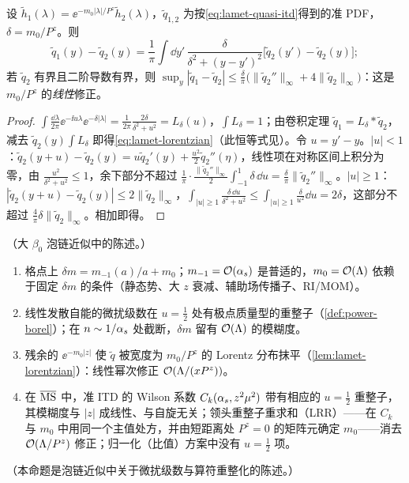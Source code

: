 \begin{lemma}\label{lem:lamet-lorentzian}
设 $\tilde h_1(\lambda)=\ee^{-m_0|\lambda|/P^z}\tilde h_2(\lambda)$，$\tilde q_{1,2}$ 为按\cref{eq:lamet-quasi-itd}得到的准 PDF，$\delta=m_0/P^z$。则
\begin{equation}\label{eq:lamet-lorentzian}
\tilde q_1(y)-\tilde q_2(y)=\frac1\pi\int\dd y'\,\frac{\delta}{\delta^2+(y-y')^2}\big[\tilde q_2(y')-\tilde q_2(y)\big];
\end{equation}
若 $\tilde q_2$ 有界且二阶导数有界，则 $\sup_y|\tilde q_1-\tilde q_2|\le\frac\delta\pi\big(\|\tilde q_2''\|_\infty+4\|\tilde q_2\|_\infty\big)$：这是 $m_0/P^z$ 的\emph{线性}修正。
\end{lemma}

\begin{proof}
$\int\frac{\dd\lambda}{2\pi}\ee^{-\ii u\lambda}\ee^{-\delta|\lambda|}=\frac1{2\pi}\frac{2\delta}{\delta^2+u^2}=L_\delta(u)$，$\int L_\delta=1$；由卷积定理 $\tilde q_1=L_\delta*\tilde q_2$，减去 $\tilde q_2(y)\int L_\delta$ 即得\cref{eq:lamet-lorentzian}（此恒等式见\cite{Ji:2020brr}）。令 $u=y'-y$。$|u|<1$：$\tilde q_2(y+u)-\tilde q_2(y)=u\tilde q_2'(y)+\frac{u^2}2\tilde q_2''(\eta)$，线性项在对称区间上积分为零，由 $\frac{u^2}{\delta^2+u^2}\le1$，余下部分不超过 $\frac1\pi\cdot\frac{\|\tilde q_2''\|_\infty}2\int_{-1}^1\delta\,\dd u=\frac\delta\pi\|\tilde q_2''\|_\infty$。$|u|\ge1$：$|\tilde q_2(y+u)-\tilde q_2(y)|\le2\|\tilde q_2\|_\infty$，$\int_{|u|\ge1}\frac{\delta\,\dd u}{\delta^2+u^2}\le\int_{|u|\ge1}\frac{\delta}{u^2}\dd u=2\delta$，这部分不超过 $\frac4\pi\delta\|\tilde q_2\|_\infty$。相加即得。
\end{proof}

\begin{proposition}\label{prop:lamet-lrr}
（大 $\beta_0$ 泡链近似中的陈述。）
\begin{enumerate}[label=(\alph*),leftmargin=2em,itemsep=1pt,topsep=2pt]
\item 格点上 $\delta m=m_{-1}(a)/a+m_0$；$m_{-1}=\mathcal{O}\!\left(\alpha_s\right)$ 是普适的，$m_0=\mathcal{O}\!\left(\Lambda\right)$ 依赖于固定 $\delta m$ 的条件（静态势、大 $z$ 衰减、辅助场传播子、RI/MOM）。
\item 线性发散自能的微扰级数在 $u=\frac12$ 处有极点质量型的重整子（\cref{def:power-borel}）；在 $n\sim1/\alpha_s$ 处截断，$\delta m$ 留有 $\mathcal{O}\!\left(\Lambda\right)$ 的模糊度。
\item 残余的 $\ee^{-m_0|z|}$ 使 $\tilde q$ 被宽度为 $m_0/P^z$ 的 Lorentz 分布抹平（\cref{lem:lamet-lorentzian}）：线性幂次修正 $\mathcal{O}\!\left(\Lambda/(xP^z)\right)$。
\item 在 $\overline{\mathrm{MS}}$ 中，准 ITD 的 Wilson 系数 $C_k(\alpha_s,z^2\mu^2)$ 带有相应的 $u=\frac12$ 重整子，其模糊度与 $|z|$ 成线性、与自旋无关；领头重整子重求和（LRR）——在 $C_k$ 与 $m_0$ 中用同一个主值处方，并由短距离处 $P^z=0$ 的矩阵元确定 $m_0$——消去 $\mathcal{O}\!\left(\Lambda/P^z\right)$ 修正；归一化（比值）方案中没有 $u=\frac12$ 项。
\end{enumerate}
（本命题是泡链近似中关于微扰级数与算符重整化的陈述。）
\end{proposition}

